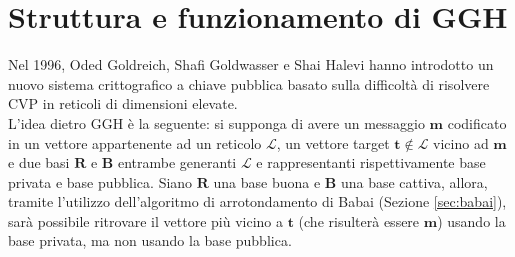 \section{Struttura e funzionamento di GGH}
Nel 1996, Oded Goldreich, Shafi Goldwasser e Shai Halevi\cite{GGH97} hanno introdotto un nuovo 
sistema crittografico a chiave pubblica basato sulla difficoltà di risolvere CVP in reticoli
di dimensioni elevate. 
\\
L'idea dietro GGH è la seguente: si supponga di avere un messaggio $\mathbf{m}$ 
codificato in un vettore appartenente ad un reticolo $\mathcal{L}$, un vettore target 
$\mathbf{t} \notin \mathcal{L}$ vicino ad $\mathbf{m}$ e
due basi $\mathbf{R}$ e $\mathbf{B}$ entrambe generanti $\mathcal{L}$
e rappresentanti rispettivamente base privata e base pubblica. 
Siano $\mathbf{R}$ una base buona e $\mathbf{B}$ una base cattiva, allora, tramite l'utilizzo
dell'algoritmo di arrotondamento di Babai (Sezione \ref*{sec:babai}), sarà possibile ritrovare
il vettore più vicino a $\mathbf{t}$ (che risulterà essere $\mathbf{m}$) usando la base privata,
ma non usando la base pubblica.

